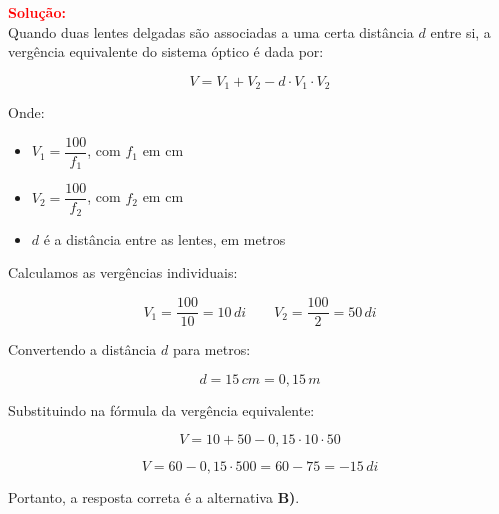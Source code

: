 \begin{flushleft}
\begin{center}
\end{center}

\textcolor{red}{\textbf{Solu\c{c}\~ao:}}\\

Quando duas lentes delgadas s\~ao associadas a uma certa dist\^ancia $d$ entre si, a verg\^encia equivalente do sistema \'optico \'{e} dada por:

\[
\boxed{
V = V_1 + V_2 - d \cdot V_1 \cdot V_2
}
\]

Onde:
\begin{itemize}
    \item $V_1 = \dfrac{100}{f_1}$, com $f_1$ em cm
    \item $V_2 = \dfrac{100}{f_2}$, com $f_2$ em cm
    \item $d$ \'e a dist\^ancia entre as lentes, em metros
\end{itemize}

Calculamos as verg\^encias individuais:

\[
V_1 = \frac{100}{10} = 10\,di
\qquad
V_2 = \frac{100}{2} = 50\,di
\]

Convertendo a dist\^ancia $d$ para metros:

\[
d = 15\,cm = 0{,}15\,m
\]

Substituindo na f\'ormula da verg\^encia equivalente:

\[
V = 10 + 50 - 0{,}15 \cdot 10 \cdot 50
\]

\[
V = 60 - 0{,}15 \cdot 500 = 60 - 75 = -15\,di
\]

\vspace{0.3cm}

Portanto, a resposta correta \'e a alternativa \colorbox{green!50}{\textbf{B)}}.

\end{flushleft}


